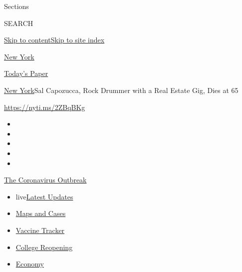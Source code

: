 Sections

SEARCH

\protect\hyperlink{site-content}{Skip to
content}\protect\hyperlink{site-index}{Skip to site index}

\href{https://www.nytimes3xbfgragh.onion/section/nyregion}{New York}

\href{https://myaccount.nytimes3xbfgragh.onion/auth/login?response_type=cookie\&client_id=vi}{}

\href{https://www.nytimes3xbfgragh.onion/section/todayspaper}{Today's
Paper}

\href{/section/nyregion}{New York}\textbar{}Sal Capozucca, Rock Drummer
with a Real Estate Gig, Dies at 65

\url{https://nyti.ms/2ZBqBKg}

\begin{itemize}
\item
\item
\item
\item
\item
\end{itemize}

\href{https://www.nytimes3xbfgragh.onion/news-event/coronavirus?action=click\&pgtype=Article\&state=default\&region=TOP_BANNER\&context=storylines_menu}{The
Coronavirus Outbreak}

\begin{itemize}
\tightlist
\item
  live\href{https://www.nytimes3xbfgragh.onion/2020/08/04/world/coronavirus-covid-19.html?action=click\&pgtype=Article\&state=default\&region=TOP_BANNER\&context=storylines_menu}{Latest
  Updates}
\item
  \href{https://www.nytimes3xbfgragh.onion/interactive/2020/us/coronavirus-us-cases.html?action=click\&pgtype=Article\&state=default\&region=TOP_BANNER\&context=storylines_menu}{Maps
  and Cases}
\item
  \href{https://www.nytimes3xbfgragh.onion/interactive/2020/science/coronavirus-vaccine-tracker.html?action=click\&pgtype=Article\&state=default\&region=TOP_BANNER\&context=storylines_menu}{Vaccine
  Tracker}
\item
  \href{https://www.nytimes3xbfgragh.onion/2020/08/02/us/covid-college-reopening.html?action=click\&pgtype=Article\&state=default\&region=TOP_BANNER\&context=storylines_menu}{College
  Reopening}
\item
  \href{https://www.nytimes3xbfgragh.onion/live/2020/08/03/business/stock-market-today-coronavirus?action=click\&pgtype=Article\&state=default\&region=TOP_BANNER\&context=storylines_menu}{Economy}
\end{itemize}


